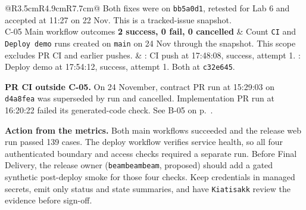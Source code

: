 \begin{longtable}{@{}R{3.5cm}R{4.9cm}R{7.7cm}@{}}
Both fixes were on \texttt{bb5a0d1}, retested for Lab 6 and accepted at 11:27 on 22 Nov. This is a tracked-issue snapshot. \\
C-05 \newline Main workflow outcomes \newline \textbf{2 success, 0 fail, 0 cancelled} &
Count \texttt{CI} and \texttt{Deploy demo} runs created on \texttt{main} on 24 Nov through the snapshot. This scope excludes PR CI and earlier pushes. &
: CI push at 17:48:08, success, attempt 1. \newline
{}: Deploy demo at 17:54:12, success, attempt 1. Both at \texttt{c32e645}. \\
\bottomrule
\end{longtable}

\textbf{PR CI outside C-05.}
On 24 November, contract PR run  at 15:29:03 on \texttt{d4a8fea} was superseded by run  and cancelled. Implementation PR run  at 16:20:22 failed its generated-code check. See B-05 on p.~\pageref{ev:release}.

\textbf{Action from the metrics.}
Both main workflows succeeded and the release web run passed 139 cases. The deploy workflow verifies service health, so all four authenticated boundary and access checks required a separate run. Before Final Delivery, the release owner (\texttt{beambeambeam}, proposed) should add a gated synthetic post-deploy smoke for those four checks. Keep credentials in managed secrets, emit only status and state summaries, and have \texttt{Kiatisakk} review the evidence before sign-off.
